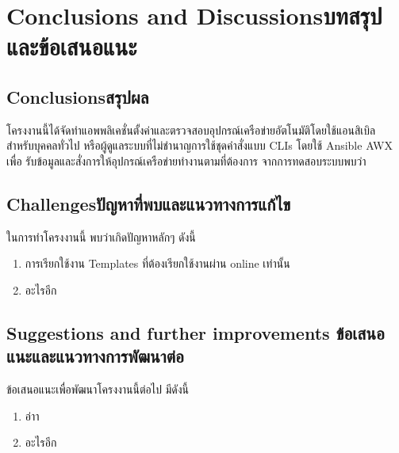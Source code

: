 \chapter{\ifenglish Conclusions and Discussions\else บทสรุปและข้อเสนอแนะ\fi}

\section{\ifenglish Conclusions\else สรุปผล\fi}

\hspace{0.5in}โครงงานนี้ได้จัดทำแอพพลิเคชั่นตั้งค่าและตรวจสอบอุปกรณ์เครือข่ายอัตโนมัติโดยใช้แอนสิเบิล
สำหรับบุคคลทั่วไป หรือผู้ดูแลระบบที่ไม่ชำนาญการใช้ชุดคำสั่งแบบ CLIs โดยใช้ Ansible AWX เพื่อ
รับข้อมูลและสั่งการให้อุปกรณ์เครือข่ายทำงานตามที่ต้องการ จากการทดสอบระบบพบว่า

\section{\ifenglish Challenges\else ปัญหาที่พบและแนวทางการแก้ไข\fi}

\hspace{0.5in}ในการทำโครงงานนี้ พบว่าเกิดปัญหาหลักๆ ดังนี้
\begin{enumerate}
    \item การเรียกใช้งาน Templates ที่ต้องเรียกใช้งานผ่าน online เท่านั้น
    \item อะไรอีก
  \end{enumerate}
\section{\ifenglish%
Suggestions and further improvements
\else%
ข้อเสนอแนะและแนวทางการพัฒนาต่อ
\fi
}

\hspace{0.5in}ข้อเสนอแนะเพื่อพัฒนาโครงงานนี้ต่อไป มีดังนี้
\begin{enumerate}
    \item อ่าา
    \item อะไรอีก
  \end{enumerate}
